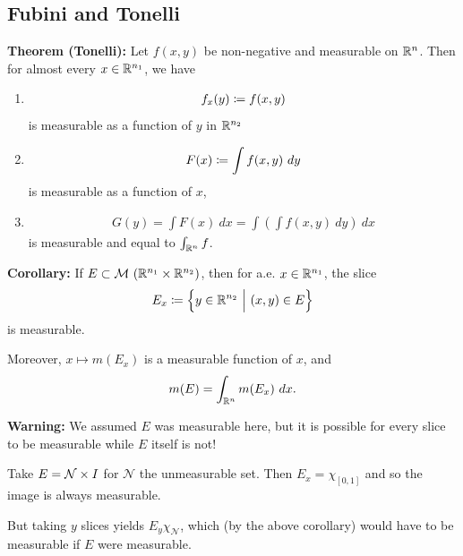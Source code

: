 \hypertarget{fubini-and-tonelli}{%
\subsection{Fubini and Tonelli}\label{fubini-and-tonelli}}

\textbf{Theorem (Tonelli):} Let \(f(x, y)\) be non-negative and
measurable on \({\mathbb{R}}^n\). Then for almost every \(x\in {\mathbb{R}}^{n_1}\), we
have

\begin{enumerate}
\def\labelenumi{\arabic{enumi}.}
\item

  \begin{align*}f_x(y) \coloneqq f(x, y)\end{align*} is measurable as a
  function of \(y\) in \({\mathbb{R}}^{n_2}\)
\item

  \begin{align*}F(x) \coloneqq \int f(x, y) ~dy\end{align*} is
  measurable as a function of \(x\),
\item

  \begin{align*}G(y) = \int F(x) ~dx = \int \left( \int f(x, y) ~dy\right) ~dx\end{align*}
  is measurable and equal to \(\int_{{\mathbb{R}}^n} f\).
\end{enumerate}

\textbf{Corollary:} If
\(E \subset \mathcal{M}~({\mathbb{R}}^{n_1} \times {\mathbb{R}}^{n_2})\), then for a.e.
\(x\in {\mathbb{R}}^{n_1}\), the slice
\begin{align*}
E_x \coloneqq \left\{{y\in{\mathbb{R}}^{n_2} {~\mathrel{\Big|}~} (x,y) \in E}\right\}
\end{align*} is measurable.

Moreover, \(x \mapsto m(E_x)\) is a measurable function of \(x\), and
\begin{align*}
m(E) = \int_{{\mathbb{R}}^n} m(E_x) ~dx
.\end{align*}

\textbf{Warning:} We assumed \(E\) was measurable here, but it is
possible for every slice to be measurable while \(E\) itself is not!

Take \(E = \mathcal{N} \times I\) for \(\mathcal{N}\) the unmeasurable
set. Then \(E_x = \chi_{[0, 1]}\) and so the image is always measurable.

But taking \(y\) slices yields \(E_y \chi_{\mathcal{N}}\), which (by the
above corollary) would have to be measurable if \(E\) were measurable.

